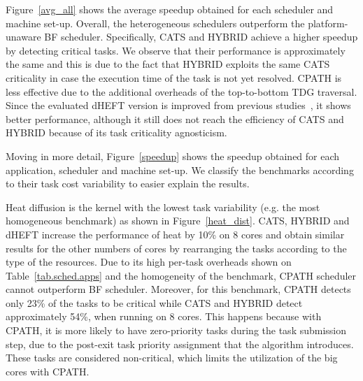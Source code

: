 Figure~\ref{avg_all} shows the average speedup obtained for each scheduler and machine set-up. 
Overall, the heterogeneous schedulers outperform the platform-unaware BF scheduler.
Specifically, CATS and HYBRID achieve a higher speedup by detecting critical tasks.
We observe that their performance is approximately the same and this is due to the fact that HYBRID exploits the same CATS criticality in case the execution time of the task is not yet resolved.
CPATH is less effective due to the additional overheads of the top-to-bottom TDG traversal.
Since the evaluated dHEFT version is improved from previous studies~\cite{Chronaki:ICS2015}, it shows better performance, although it still does not reach the efficiency of CATS and HYBRID because of its task criticality agnosticism.

Moving in more detail, Figure~\ref{speedup} shows the speedup obtained for each application,  scheduler and machine set-up.
We classify the benchmarks according to their task cost variability to easier explain the results.



Heat diffusion is the kernel with the lowest task variability (e.g. the most homogeneous benchmark) as shown in Figure~\ref{heat_dist}.
CATS, HYBRID and dHEFT increase the performance of heat by 10\% on 8 cores and obtain similar results for the other numbers of cores by rearranging the tasks according to the type of the resources.
Due to its high per-task overheads shown on Table~\ref{tab.sched.apps}
 and the homogeneity of the benchmark, CPATH scheduler cannot outperform BF scheduler. 
Moreover, for this benchmark, CPATH detects only 23\% of the tasks to be critical while CATS and HYBRID detect approximately 54\%, when running on 8 cores.
This happens because with CPATH, it is more likely to have zero-priority tasks during the task submission step, due to the post-exit task priority assignment that the algorithm introduces. 
These tasks are considered non-critical, which limits the utilization of the big cores with CPATH. 

